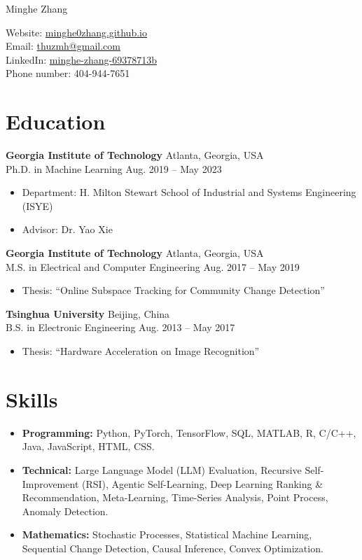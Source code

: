 \documentclass[10pt,letterpaper]{article}
\newcommand{\entry}[4]{%
  \noindent\hspace{1.2em}\begin{minipage}[t]{\dimexpr\textwidth-1.2em\relax}
    \textbf{#1} \hfill #2 \\
    #3 \hfill #4
  \end{minipage}\par\vspace{0.1em}
}
\newenvironment{cvitems}{%
  \begin{itemize}[leftmargin=2.8em,label=--,topsep=1pt,itemsep=1pt,parsep=0pt]
}{%
  \end{itemize}\vspace{0.2em}
}
\begin{document}
\noindent
\begin{minipage}[c]{0.52\textwidth}
  {\fontsize{24}{28}\selectfont\color{cvteal} Minghe Zhang}
\end{minipage}%
\begin{minipage}[c]{0.48\textwidth}
  \raggedleft\small
  Website: \href{https://minghe0zhang.github.io}{minghe0zhang.github.io}\\
  Email: \href{mailto:thuzmh@gmail.com}{thuzmh@gmail.com}\\
  LinkedIn: \href{https://www.linkedin.com/in/minghe-zhang-69378713b/}{minghe-zhang-69378713b}\\
  Phone number: 404-944-7651
\end{minipage}

\vspace{0.6em}

\section{Education}

\entry{Georgia Institute of Technology}{Atlanta, Georgia, USA}{Ph.D. in Machine Learning}{Aug. 2019 -- May 2023}
\begin{cvitems}
  \item Department: H. Milton Stewart School of Industrial and Systems Engineering (ISYE)
  \item Advisor: Dr. Yao Xie
\end{cvitems}

\entry{Georgia Institute of Technology}{Atlanta, Georgia, USA}{M.S. in Electrical and Computer Engineering}{Aug. 2017 -- May 2019}
\begin{cvitems}
  \item Thesis: ``Online Subspace Tracking for Community Change Detection''
\end{cvitems}

\entry{Tsinghua University}{Beijing, China}{B.S. in Electronic Engineering}{Aug. 2013 -- May 2017}
\begin{cvitems}
  \item Thesis: ``Hardware Acceleration on Image Recognition''
\end{cvitems}

\section{Skills}

\begin{itemize}[leftmargin=1.5em,topsep=2pt,itemsep=2.5pt,parsep=0pt]
  \item \textbf{Programming:} Python, PyTorch, TensorFlow, SQL, MATLAB, R, C/C++, Java, JavaScript, HTML, CSS.
  \item \textbf{Technical:} Large Language Model (LLM) Evaluation, Recursive Self-Improvement (RSI), Agentic Self-Learning, Deep Learning Ranking \& Recommendation, Meta-Learning, Time-Series Analysis, Point Process, Anomaly Detection.
  \item \textbf{Mathematics:} Stochastic Processes, Statistical Machine Learning, Sequential Change Detection, Causal Inference, Convex Optimization.
\end{itemize}
\end{document}
